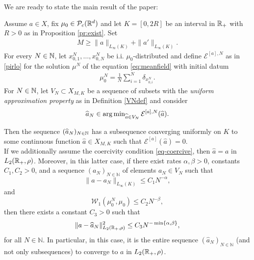 We are ready to state the main result of the paper:

\begin{theorem}\label{thm} Assume $a\in X$, fix $\mu_0 \in \mathcal{P}_c(\mathbb{R}^d)$ and let  $K=[0,2R]$ be an interval in $\mathbb{R}_+$ with $R>0$ as in Proposition \ref{pr:exist}.
	Set
	\begin{align*}
	M \geq \|a\|_{L_{\infty}(K)} + \|a'\|_{L_{\infty}(K)}.
	\end{align*}
	For every $N \in \mathbb{N}$, let $x_{0,1}^N,\ldots,x_{0,N}^N$ be i.i. $\mu_0$-distributed and define  $\mathcal E^{[a],N}$ as in \eqref{pirlo} for the solution $\mu^N$ of the equation \eqref{eq:meanfield} with initial datum
	\begin{align*}
	\mu^N_0 = \frac{1}{N}\sum^N_{i = 1} \delta_{x_{0,i}^N}.
	\end{align*}
	For  $N \in \mathbb{N}$, let $V_N\subset X_{M,K}$ be a sequence of subsets with the \emph{uniform approximation property} as in Definition \ref{VNdef} and consider
	\begin{align*}
		\widehat a_N\in\operatorname{arg\,min}_{\widehat a\in V_N} \mathcal E^{[a],N}(\widehat a).
	\end{align*}
	
Then the sequence $(\widehat a_{N})_{N \in \mathbb{N}}$ has a subsequence converging uniformly on $K$ to some continuous function $\widehat a \in X_{M,K}$ such that
$\mathcal E^{[a]}(\widehat a)=0$. \\
 If we additionally assume the coercivity condition \eqref{eq-coercive}, then $\widehat a=a$ in $L_2(\mathbb{R}_+,\rho)$. Moreover, in this latter case, if there exist  rates $\alpha,\beta >0$, constants $C_1,C_2>0$, and a sequence $(a_N)_{N \in \mathbb N}$ of elements $a_N \in V_N$ such that 
\begin{equation}\label{rate1}
 \| a - a_N \|_{L_\infty(K)} \leq C_1 N^{-\alpha},
\end{equation}
and 
\begin{equation}\label{rate2}
 \mathcal W_1(\mu_0^N,\mu_0) \leq C_2 N^{-\beta},
\end{equation}
then there exists a constant $C_3>0$ such that 
\begin{equation}\label{rateapprox}
 \| a - \widehat a_N \|_{L_2(\mathbb{R}_+,\rho)}^2 \leq C_3 N^{-\min\{ \alpha, \beta\}},
\end{equation}
for all $N \in \mathbb N$. In particular, in this case, it is the entire sequence $(\widehat a_N)_{N \in \mathbb N}$ (and not only subsequences) to converge to $a$ in $L_2(\mathbb{R}_+,\rho)$.

\end{theorem}
